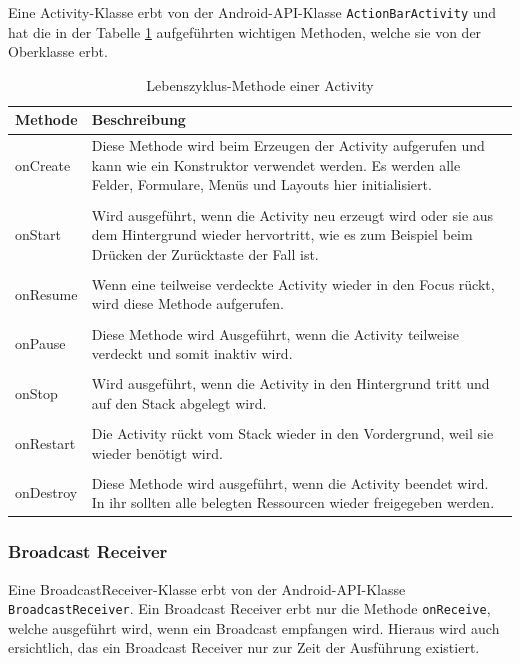 Eine Activity-Klasse erbt von der Android-API-Klasse \texttt{ActionBarActivity} und hat die in der Tabelle \ref{Lebenszyklus-Methode einer Activity} aufgef\"uhrten wichtigen Methoden, welche sie von der Oberklasse erbt.

\begin{table}[!ht]
\begin{tabular}{|p{3cm}|p{12cm}|}
 \hline Methode & Beschreibung \\
 \hline onCreate & Diese Methode wird beim Erzeugen der Activity aufgerufen und kann wie ein Konstruktor verwendet werden. Es werden alle Felder, Formulare, Men\"us und Layouts hier initialisiert.\\&\\
 onStart & Wird ausgef\"uhrt, wenn die Activity neu erzeugt wird oder sie aus dem Hintergrund wieder hervortritt, wie es zum Beispiel beim Dr\"ucken der Zur\"ucktaste der Fall ist.\\&\\
 onResume & Wenn eine teilweise verdeckte Activity wieder in den Focus r\"uckt, wird diese Methode aufgerufen.\\&\\
 onPause & Diese Methode wird Ausgef\"uhrt, wenn die Activity teilweise verdeckt und somit inaktiv wird.\\&\\
 onStop & Wird ausgef\"uhrt, wenn die Activity in den Hintergrund tritt und auf den Stack abgelegt wird.\\&\\
 onRestart & Die Activity r\"uckt vom Stack wieder in den Vordergrund, weil sie wieder ben\"otigt wird.\\&\\
 onDestroy & Diese Methode wird ausgef\"uhrt, wenn die Activity beendet wird. In ihr sollten alle belegten Ressourcen wieder freigegeben werden.\\
 \hline
\end{tabular}
\caption{Lebenszyklus-Methode einer Activity \cite{Android44}}
\label{Lebenszyklus-Methode einer Activity}
\end{table}
\FloatBarrier

\subsubsection{Broadcast Receiver} \label{Broadcast Receiver aus Programmierersicht}
Eine BroadcastReceiver-Klasse erbt von der Android-API-Klasse \texttt{BroadcastReceiver}. Ein Broadcast Receiver erbt nur die Methode \texttt{onReceive}, welche ausgef\"uhrt wird, wenn ein Broadcast empfangen wird. Hieraus wird auch ersichtlich, das ein Broadcast Receiver nur zur Zeit der Ausf\"uhrung existiert.

